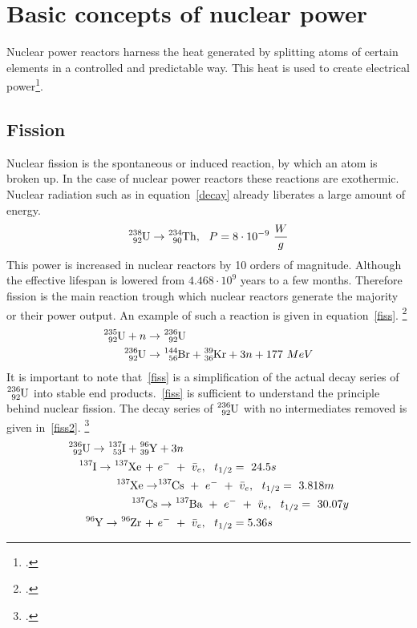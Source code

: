 \chapter{Basic concepts of nuclear power}
Nuclear power reactors harness the heat generated by splitting atoms of certain
elements in a controlled and predictable way. This heat is used to create electrical power\footcite{WNPR}.
\section{Fission}
Nuclear fission is the spontaneous or induced reaction, by which an atom is broken up. In the
case of nuclear power reactors these reactions are exothermic. Nuclear radiation such as in equation~\ref{decay}
already liberates a large amount of energy.
\begin{equation} \label{decay}
    \ce{^{238}_{92}U} \rightarrow \ce{^{234}_{90}Th}, ~~P = 8 \cdot 10^{-9} ~\frac{W}{g}
\end{equation}
This power is increased in nuclear reactors by 10 orders of magnitude. Although the effective lifespan
is lowered from $4.468 \cdot 10^{9}$ years to a few months. Therefore fission is the main reaction
trough which nuclear reactors generate the majority or their power output. An example of such
a reaction is given in equation~\ref{fiss}. \footcite[286]{nucfundamentals}
\begin{equation} \label{fiss}
\begin{split}
    \ce{^{235}_{92}U} + n & \rightarrow \ce{^{236}_{92}U} \\
    \ce{^{236}_{92}U} & \rightarrow \ce{^{144}_{56}Br} + \ce{^{39}_{36}Kr} + 3n + 177 ~MeV
\end{split}
\end{equation}
It is important to note that~\ref{fiss} is a simplification of the actual decay series of $\ce{^{236}_{92}U}$ into
stable end products.~\ref{fiss} is sufficient to understand the principle behind nuclear fission.
The decay series of $\ce{^{236}_{92}U}$ with no intermediates removed is given in~\ref{fiss2}. \footcite[287]{nucfundamentals}
\begin{equation} \label{fiss2}
    \begin{split}
        \ce{^{236}_{92}U} \rightarrow \ce{^{137}_{53}I} + \ce{^{96}_{39}Y} & + 3n \\
            \ce{^{137}I} \rightarrow \ce{^{137}Xe} ~+~ & e^{-} ~+~ \bar{v}_{e}, ~~t_{1/2}=~24.5s \\
                \ce{^{137}Xe} \rightarrow & \ce{^{137}Cs} ~+~ e^{-} ~+~ \bar{v}_{e}, ~~t_{1/2}=~3.818m \\
                    \ce{^{137}Cs}& \rightarrow \ce{^{137}Ba} ~+~ e^{-} ~+~ \bar{v}_{e}, ~~t_{1/2}=~30.07y \\
            \ce{^{96}Y} \rightarrow \ce{^{96}Zr} ~+~ & e^{-} ~+~ \bar{v}_{e}, ~~t_{1/2}=5.36s 
    \end{split}
\end{equation}

